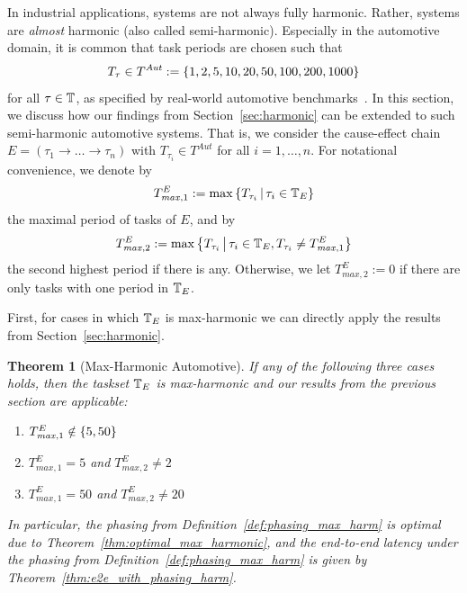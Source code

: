 \documentclass[10pt,conference]{resources/IEEEtran}
\newtheorem{theorem}{Theorem}%
\theoremstyle{definition}
\newcommand{\Tmaxone}{T^E_{\mathit{max},1}}
\newcommand{\Tmaxtwo}{T^E_{\mathit{max},2}}
\begin{document}
	In industrial applications, systems are not always fully harmonic. 
	Rather, systems are \emph{almost} harmonic (also called semi-harmonic).
	Especially in the automotive domain, it is common that task periods are chosen such that 
	\begin{equation}
		T_\tau \in T^{\mathit{Aut}} := \left\{{1,2,5,10,20,50,100,200,1000}\right\} 
	\end{equation} 
	for all $\tau \in \mathbb{T}$,
	as specified by real-world automotive benchmarks~\cite{kramer2015real}.
	In this section, we discuss how our findings from Section~\ref{sec:harmonic} can be extended to such semi-harmonic automotive systems.
	That is, we consider the cause-effect chain $E = (\tau_1 \to\dots\to \tau_n)$ with $T_{\tau_i} \in T^{\mathit{Aut}}$ for all $i=1, \dots, n$.
	For notational convenience, we denote by 
	\begin{equation}
		\Tmaxone := \max \set{T_{\tau_i}}{\tau_i\in \Tbb_E}
	\end{equation}
	the maximal period of tasks of $E$, and by 
	\begin{equation}
		\Tmaxtwo := \max \set{T_{\tau_i}}{\tau_i\in \Tbb_E, T_{\tau_i} \neq \Tmaxone}
	\end{equation}
	the second highest period if there is any.
	Otherwise, we let $\Tmaxtwo := 0$ if there are only tasks with one period in $\mathbb{T}_E$.

	First, for cases in which $\mathbb{T}_E$ is max-harmonic we can directly apply the results from Section~\ref{sec:harmonic}.

	\begin{theorem}[Max-Harmonic Automotive]
		If any of the following three cases holds, then the taskset $\mathbb{T}_E$ is max-harmonic and our results from the previous section are applicable:
		\begin{enumerate}[label=(\roman*)]
			\item $\Tmaxone \notin \setof{5,50}$ \label{item:automotive_max_harm_case1}
			\item $\Tmaxone = 5$ and $\Tmaxtwo \neq 2$ \label{item:automotive_max_harm_case2}
			\item $\Tmaxone = 50$ and $\Tmaxtwo \neq 20$ \label{item:automotive_max_harm_case3}
		\end{enumerate}
		In particular, the phasing from Definition~\ref{def:phasing_max_harm} is optimal due to Theorem~\ref{thm:optimal_max_harmonic}, and the end-to-end latency under the phasing from Definition~\ref{def:phasing_max_harm} is given by Theorem~\ref{thm:e2e_with_phasing_harm}.
	\end{theorem}
\end{document}
